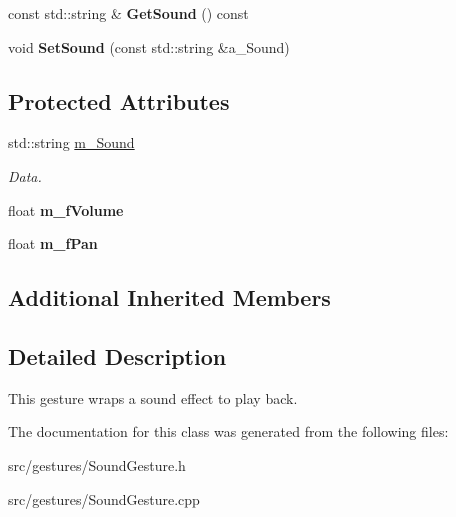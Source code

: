 \begin{DoxyCompactItemize}
\mbox{\label{class_sound_gesture_a610cfa40dec1ce8a6714488f5237b602}} 
const std\+::string \& {\bfseries Get\+Sound} () const
\item 
\mbox{\label{class_sound_gesture_a11ec55d400ee548201c2ffb4dcf216bd}} 
void {\bfseries Set\+Sound} (const std\+::string \&a\+\_\+\+Sound)
\end{DoxyCompactItemize}
\subsection*{Protected Attributes}
\begin{DoxyCompactItemize}
\item 
\mbox{\label{class_sound_gesture_a9116f8550e708bc343a084e1b17d1bd6}} 
std\+::string \hyperlink{class_sound_gesture_a9116f8550e708bc343a084e1b17d1bd6}{m\+\_\+\+Sound}
\begin{DoxyCompactList}\small\item\em Data. \end{DoxyCompactList}\item 
\mbox{\label{class_sound_gesture_a277d7ea60dcc05c8d10168732176de29}} 
float {\bfseries m\+\_\+f\+Volume}
\item 
\mbox{\label{class_sound_gesture_ae563843ba99704fe330e24b0752b6d45}} 
float {\bfseries m\+\_\+f\+Pan}
\end{DoxyCompactItemize}
\subsection*{Additional Inherited Members}


\subsection{Detailed Description}
This gesture wraps a sound effect to play back. 

The documentation for this class was generated from the following files\+:\begin{DoxyCompactItemize}
\item 
src/gestures/Sound\+Gesture.\+h\item 
src/gestures/Sound\+Gesture.\+cpp\end{DoxyCompactItemize}
